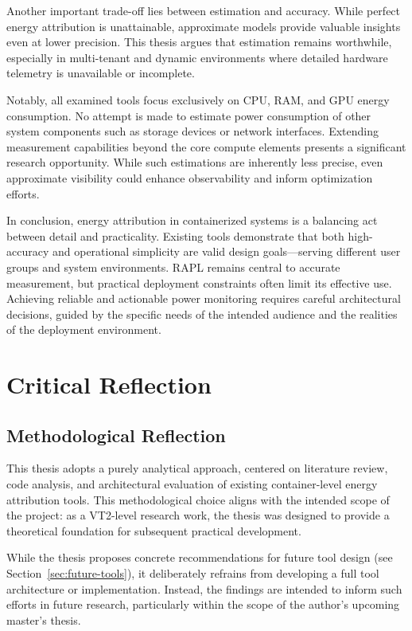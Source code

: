 Another important trade-off lies between estimation and accuracy. While perfect energy attribution is unattainable, approximate models provide valuable insights even at lower precision. This thesis argues that estimation remains worthwhile, especially in multi-tenant and dynamic environments where detailed hardware telemetry is unavailable or incomplete.

Notably, all examined tools focus exclusively on CPU, RAM, and GPU energy consumption. No attempt is made to estimate power consumption of other system components such as storage devices or network interfaces. Extending measurement capabilities beyond the core compute elements presents a significant research opportunity. While such estimations are inherently less precise, even approximate visibility could enhance observability and inform optimization efforts.

In conclusion, energy attribution in containerized systems is a balancing act between detail and practicality. Existing tools demonstrate that both high-accuracy and operational simplicity are valid design goals—serving different user groups and system environments. RAPL remains central to accurate measurement, but practical deployment constraints often limit its effective use. Achieving reliable and actionable power monitoring requires careful architectural decisions, guided by the specific needs of the intended audience and the realities of the deployment environment.

\section{Critical Reflection}

\subsection{Methodological Reflection}

This thesis adopts a purely analytical approach, centered on literature review, code analysis, and architectural evaluation of existing container-level energy attribution tools. This methodological choice aligns with the intended scope of the project: as a VT2-level research work, the thesis was designed to provide a theoretical foundation for subsequent practical development.

While the thesis proposes concrete recommendations for future tool design (see Section~\ref{sec:future-tools}), it deliberately refrains from developing a full tool architecture or implementation. Instead, the findings are intended to inform such efforts in future research, particularly within the scope of the author’s upcoming master's thesis.

